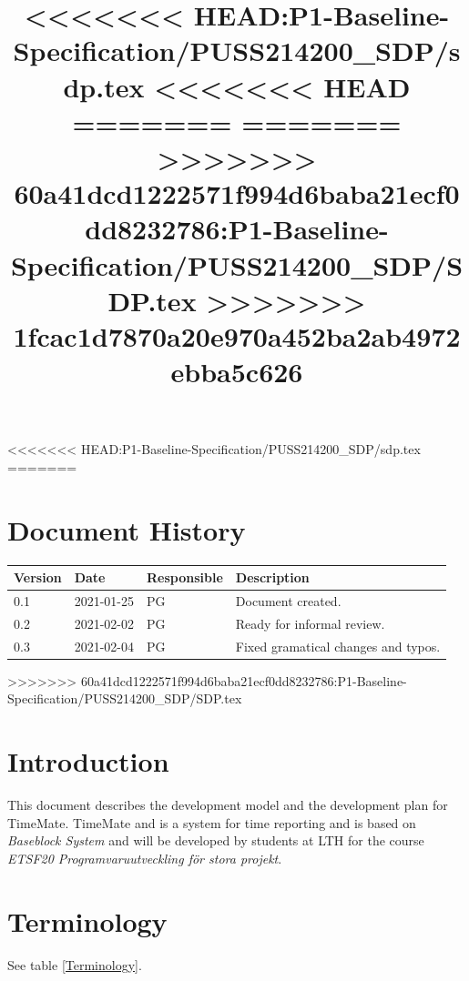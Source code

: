 \documentclass{article}
\date {#1}
\title {
<<<<<<< HEAD:P1-Baseline-Specification/PUSS214200_SDP/sdp.tex
    \documentNumber {01}    %
    \documentVersion {0.1}
<<<<<<< HEAD
    \documentTitle {Software development plan - SDP 123}
=======
=======
    \documentNumber {00}    %
    \documentVersion {0.3}
>>>>>>> 60a41dcd1222571f994d6baba21ecf0dd8232786:P1-Baseline-Specification/PUSS214200_SDP/SDP.tex
    \documentTitle {Software Development Plan}
>>>>>>> 1fcac1d7870a20e970a452ba2ab4972ebba5c626
    \documentGroup {2}
    \documentResponsible {Project Management Group}
    \documentAuthors {Project Management Group}
    \documentDate {2021-02-04}
}
\begin{document}
\maketitle
\thispagestyle{empty}

\newpage

\tableofcontents

\newpage

<<<<<<< HEAD:P1-Baseline-Specification/PUSS214200_SDP/sdp.tex
=======
\section{Document History}
\begin{tabular}{ l | l | l | l }
    Version & Date & Responsible & Description \\
    \hline
    0.1 & 2021-01-25 & PG & Document created. \\
    0.2 & 2021-02-02 & PG & Ready for informal review. \\
    0.3 & 2021-02-04 & PG & Fixed gramatical changes and typos. \\
\end{tabular}
>>>>>>> 60a41dcd1222571f994d6baba21ecf0dd8232786:P1-Baseline-Specification/PUSS214200_SDP/SDP.tex

\section{Introduction}
    This document describes the development model and the development plan for TimeMate.
    TimeMate and is a system for time reporting and is based on \textit{Baseblock System} and will be developed by students at LTH for the course 
    \textit{ETSF20 Programvaruutveckling för stora projekt}.

\section{Terminology}
    
    See table \ref{Terminology}.
    
\end{document}
